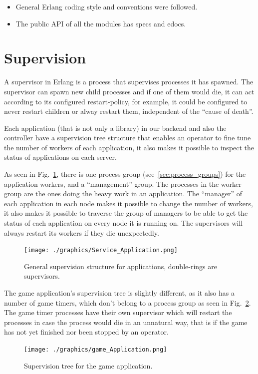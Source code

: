 \documentclass[11pt,a4paper]{report}
\begin{document}
\begin{itemize}
\item General Erlang coding style and conventions were followed.
\item The public API of all the modules has specs and edocs.
\end{itemize}


\section{Supervision}
A supervisor in Erlang is a process that supervises processes it has spawned.
The supervisor can spawn new child processes and if one of them would die, it
can act according to its configured restart-policy, for example, it could be
configured to never restart children or alway restart them, independent of the
``cause of death''.

Each application (that is not only a library) in our backend and also the
controller have a supervision tree structure that enables an operator to fine
tune the number of workers of each application, it also makes it possible
to inspect the status of applications on each server.

As seen in Fig.~\ref{fig:service_app}, there is one process group
(see~\ref{sec:process_groups}) for the application workers, and a ``management''
group. The processes in the worker group are the ones doing the heavy work in an
application. The ``manager'' of each application in each node makes it
possible to change the number of workers, it also makes it possible to traverse
the group of managers to be able to get the status of each application on every
node it is running on. The supervisors will always restart its workers if they
die unexpectedly.
\begin{figure}[h]
 \centering
 \texttt{[image: ./graphics/Service\_Application.png]}
 \caption{General supervision structure for applications, double-rings are
supervisors.}
 \label{fig:service_app}
\end{figure}

The game application's supervision tree is slightly different, as it also has a
number of game timers, which don't belong to a process group as seen in
Fig.~\ref{fig:game_app}. The game timer processes have their own supervisor
which will restart the processes in case the process would die in an unnatural
way, that is if the game has not yet finished nor been stopped by an operator.
\begin{figure}[h]
 \centering
 \texttt{[image: ./graphics/game\_Application.png]}
 \caption{Supervision tree for the game application.}
 \label{fig:game_app}
\end{figure}
\end{document}
